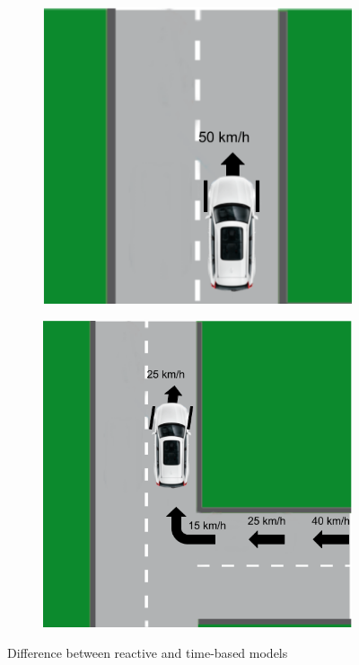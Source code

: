 \documentclass{cys}
\begin{document}
\begin{figure}[h]
	\centering
	\begin{subfigure}{0.22\textwidth} 
		\includegraphics[width=\textwidth]{img/reactive}
		\label{subfig:reactive}
	\end{subfigure}
	\begin{subfigure}{0.211\textwidth} 
		\includegraphics[width=\textwidth]{img/recurrent}
		\label{subfig:recurrent}
	\end{subfigure}
	\caption{Difference between reactive and time-based models} 
	\label{fig:comparsion}
\end{figure}
\end{document}
